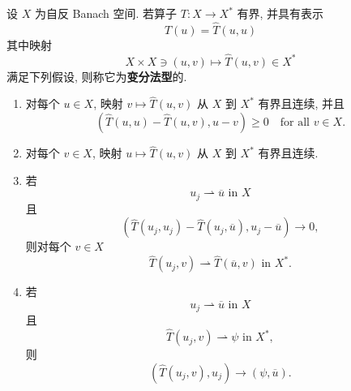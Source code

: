 \begin{Definition}
\label{def:calculus-variations-type-operator}
设 $X$ 为自反 Banach 空间. 若算子 $T:X\to X^*$ 有界, 并具有表示
\begin{equation}\label{eq:calculus-variations-type-diagonal-representation}
T(u)=\widehat T(u,u)
\end{equation}
其中映射
\begin{equation}\label{eq:calculus-variations-type-two-argument-mapping}
X\times X\ni(u,v)\mapsto\widehat T(u,v)\in X^*
\end{equation}
满足下列假设, 则称它为\textbf{变分法型}的.\begin{enumerate}[label=CV-\arabic*.,ref=CV-\arabic*]\item\label{hyp:cv-diagonal-monotonicity} 对每个 $u\in X$, 映射 $v\mapsto\widehat T(u,v)$ 从 $X$ 到 $X^*$ 有界且连续, 并且
\begin{equation}\label{eq:calculus-variations-type-diagonal-monotonicity}
(\widehat T(u,u)-\widehat T(u,v),u-v)\geq0\quad\text{for all }v\in X.
\end{equation}
\item\label{hyp:cv-first-variable-continuity} 对每个 $v\in X$, 映射 $u\mapsto\widehat T(u,v)$ 从 $X$ 到 $X^*$ 有界且连续.\item\label{hyp:cv-vanishing-defect-weak-continuity} 若
\begin{equation}\label{eq:calculus-variations-type-cv-three-weak-sequence}
u_j\rightharpoonup\overline u\text{ in }X
\end{equation}
且
\begin{equation}\label{eq:calculus-variations-type-vanishing-diagonal-pairing}
(\widehat T(u_j,u_j)-\widehat T(u_j,\overline u),u_j-\overline u)\to0,
\end{equation}
则对每个 $v\in X$
\begin{equation}\label{eq:calculus-variations-type-weak-image-continuity}
\widehat T(u_j,v)\rightharpoonup\widehat T(\overline u,v)\text{ in }X^*.
\end{equation}
\item\label{hyp:cv-weak-duality-pairing} 若
\begin{equation}\label{eq:calculus-variations-type-cv-four-weak-sequence}
u_j\rightharpoonup\overline u\text{ in }X
\end{equation}
且
\begin{equation}\label{eq:calculus-variations-type-cv-four-weak-image}
\widehat T(u_j,v)\rightharpoonup\psi\text{ in }X^*,
\end{equation}
则
\begin{equation}\label{eq:calculus-variations-type-cv-four-pairing-convergence}
(\widehat T(u_j,v),u_j)\to(\psi,\overline u).
\end{equation}
\end{enumerate}
\end{Definition}

